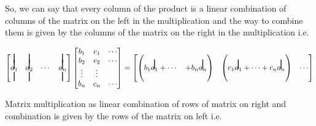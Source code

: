 \documentclass{article}
\newcommand\vstrike[1]{\stackon[0pt]{#1}{\smash{\rule[-3pt]{1pt}{2.9ex}}}}
\begin{document}
So, we can say that every column of the product is a linear combination of columns of the matrix on the left in the multiplication and the way to combine them is given by the columns of the matrix on the right in the multiplication i.e.

\[
    \begin{bmatrix}
        \vstrike{} & \vstrike{} & & \vstrike{}\\
        \vstrike{$a_1$} & \vstrike{$a_2$} & \cdots & \vstrike{$a_n$}\\
      \vstrike{} & \vstrike{} & & \vstrike{}\\
    \end{bmatrix} \begin{bmatrix}
                    b_1 & c_1 & \cdots \\
                    b_2 & c_2 & \cdots \\
                    \vdots & \vdots &   \\
                    b_n & c_n & \cdots
    \end{bmatrix} = \begin{bmatrix}
                \begin{pmatrix}
                \\
                    b_1\vstrike{$a_1$}+\cdots&+b_n\vstrike{$a_n$}\\
                \\
                \end{pmatrix} & \begin{pmatrix}
                \\
                    c_1 \vstrike{$a_1$}+\cdots+c_n\vstrike{$a_n$}\\
                \\    
                \end{pmatrix} &\cdots
    \end{bmatrix}
\]

Matrix multiplication as linear combination of rows of matrix on right and combination is given by the rows of the matrix on left i.e. 
\end{document}
